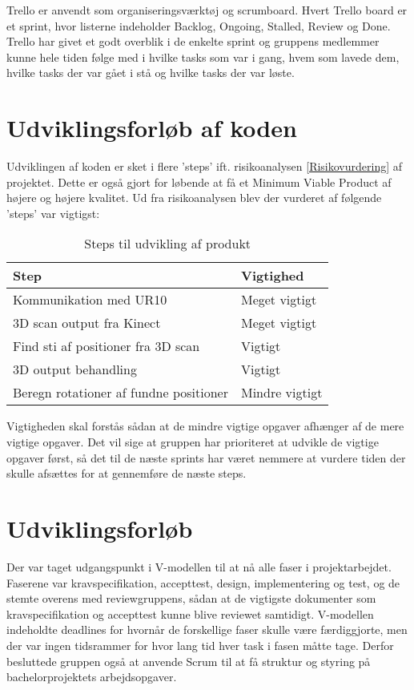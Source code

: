 Trello er anvendt som organiseringsværktøj og scrumboard. Hvert Trello board er et sprint, hvor listerne indeholder Backlog, Ongoing, Stalled, Review og Done. Trello har givet et godt overblik i de enkelte sprint og gruppens medlemmer kunne hele tiden følge med i hvilke tasks som var i gang, hvem som lavede dem, hvilke tasks der var gået i stå og hvilke tasks der var løste. 

\section{Udviklingsforløb af koden}
Udviklingen af koden er sket i flere 'steps' ift. risikoanalysen \ref{Risikovurdering} af projektet. Dette er også gjort for løbende at få et Minimum Viable Product af højere og højere kvalitet. 
Ud fra risikoanalysen blev der vurderet af følgende 'steps' var vigtigst:

\begin{table}[h]
\centering
\begin{tabular}{|l| p{}|}
\hline
\textbf{Step} &  \textbf{Vigtighed} \\\hline
	Kommunikation med UR10 & Meget vigtigt \\\hline
	3D scan output fra Kinect & Meget vigtigt\\\hline
	Find sti af positioner fra 3D scan & Vigtigt \\\hline
	3D output behandling & Vigtigt \\\hline
	Beregn rotationer af fundne positioner & Mindre vigtigt \\\hline
\end{tabular}
\caption{Steps til udvikling af produkt}
\end{table}

Vigtigheden skal forstås sådan at de mindre vigtige opgaver afhænger af de mere vigtige opgaver. 
Det vil sige at gruppen har prioriteret at udvikle de vigtige opgaver først, så det til de næste sprints har været nemmere at vurdere tiden der skulle afsættes for at gennemføre de næste steps.

\section{Udviklingsforløb}
Der var taget udgangspunkt i V-modellen til at nå alle faser i projektarbejdet. Faserene var kravspecifikation, accepttest, design, implementering og test, og de stemte overens med reviewgruppens, sådan at de vigtigste dokumenter som kravspecifikation og accepttest kunne blive reviewet samtidigt. V-modellen indeholdte deadlines for hvornår de forskellige faser skulle være færdiggjorte, men der var ingen tidsrammer for hvor lang tid hver task i fasen måtte tage. Derfor besluttede gruppen også at anvende Scrum til at få struktur og styring på bachelorprojektets arbejdsopgaver.

